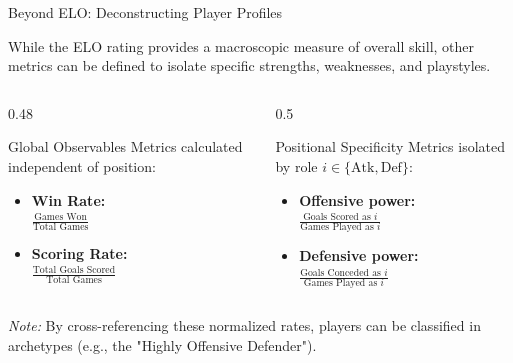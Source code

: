 \documentclass[10pt, aspectratio=169]{beamer}
\begin{document}
\begin{frame}{Beyond ELO: Deconstructing Player Profiles}

    While the ELO rating provides a macroscopic measure of overall skill, other metrics can be defined to isolate specific strengths, weaknesses, and playstyles.

    \vspace{0.5em}
    \begin{columns}[T]
        \begin{column}{0.48\textwidth}
            \begin{block}{Global Observables}
                Metrics calculated independent of position:
                \vspace{0.5em}
                \begin{itemize}
                    \item \textbf{Win Rate:} \\
                    $\frac{\text{Games Won}}{\text{Total Games}}$
                    \vspace{0.5em}
                    \item \textbf{Scoring Rate:} \\
                    $\frac{\text{Total Goals Scored}}{\text{Total Games}}$
                \end{itemize}
            \end{block}
        \end{column}

        \begin{column}{0.5\textwidth}
            \begin{block}{Positional Specificity}
                Metrics isolated by role $i \in \{\text{Atk}, \text{Def}\}$:
                \vspace{0.5em}
                \begin{itemize}
                    \item \textbf{Offensive power:} \\
                    $\frac{\text{Goals Scored as } i}{\text{Games Played as } i}$
                    \vspace{0.5em}
                    \item \textbf{Defensive power:} \\
                    $\frac{\text{Goals Conceded as } i}{\text{Games Played as } i}$
                \end{itemize}
            \end{block}
        \end{column}
    \end{columns}

    \vspace{1em}
    \textit{Note:} By cross-referencing these normalized rates, players can be classified in archetypes (e.g., the "Highly Offensive Defender").

\end{frame}
\end{document}
